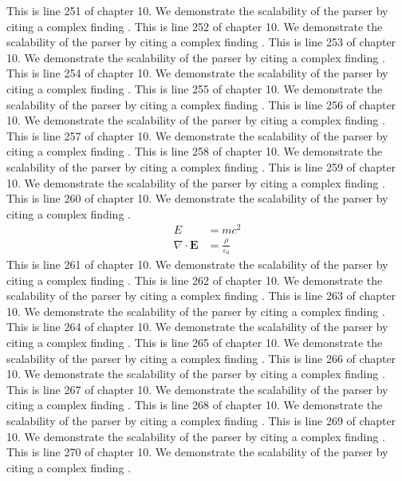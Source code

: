 This is line 251 of chapter 10. We demonstrate the scalability of the parser by citing a complex finding \cite{ref10_251}.
This is line 252 of chapter 10. We demonstrate the scalability of the parser by citing a complex finding \cite{ref10_252}.
This is line 253 of chapter 10. We demonstrate the scalability of the parser by citing a complex finding \cite{ref10_253}.
This is line 254 of chapter 10. We demonstrate the scalability of the parser by citing a complex finding \cite{ref10_254}.
This is line 255 of chapter 10. We demonstrate the scalability of the parser by citing a complex finding \cite{ref10_255}.
This is line 256 of chapter 10. We demonstrate the scalability of the parser by citing a complex finding \cite{ref10_256}.
This is line 257 of chapter 10. We demonstrate the scalability of the parser by citing a complex finding \cite{ref10_257}.
This is line 258 of chapter 10. We demonstrate the scalability of the parser by citing a complex finding \cite{ref10_258}.
This is line 259 of chapter 10. We demonstrate the scalability of the parser by citing a complex finding \cite{ref10_259}.
This is line 260 of chapter 10. We demonstrate the scalability of the parser by citing a complex finding \cite{ref10_260}.
\begin{align*}
  E &= mc^2 \\
  \nabla \cdot \mathbf{E} &= \frac{\rho}{\varepsilon_0}
\end{align*}
This is line 261 of chapter 10. We demonstrate the scalability of the parser by citing a complex finding \cite{ref10_261}.
This is line 262 of chapter 10. We demonstrate the scalability of the parser by citing a complex finding \cite{ref10_262}.
This is line 263 of chapter 10. We demonstrate the scalability of the parser by citing a complex finding \cite{ref10_263}.
This is line 264 of chapter 10. We demonstrate the scalability of the parser by citing a complex finding \cite{ref10_264}.
This is line 265 of chapter 10. We demonstrate the scalability of the parser by citing a complex finding \cite{ref10_265}.
This is line 266 of chapter 10. We demonstrate the scalability of the parser by citing a complex finding \cite{ref10_266}.
This is line 267 of chapter 10. We demonstrate the scalability of the parser by citing a complex finding \cite{ref10_267}.
This is line 268 of chapter 10. We demonstrate the scalability of the parser by citing a complex finding \cite{ref10_268}.
This is line 269 of chapter 10. We demonstrate the scalability of the parser by citing a complex finding \cite{ref10_269}.
This is line 270 of chapter 10. We demonstrate the scalability of the parser by citing a complex finding \cite{ref10_270}.
